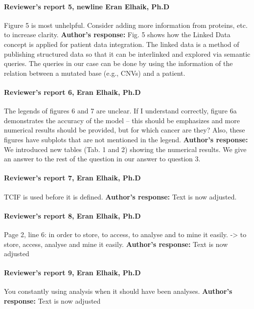 \documentclass{bmcart}
\begin{document}
\paragraph {Reviewer's report 5, newline Eran Elhaik, Ph.D}
 Figure 5 is most unhelpful. Consider adding more information from proteins, etc. to increase clarity.
\newline \textbf{Author's response:}
Fig. 5 shows how the Linked Data concept is applied for patient data integration. The linked data is a method of publishing structured data so that it can be interlinked and explored via semantic queries. The queries in our case can be done by using the information of the relation between a mutated base (e.g., CNVs) and a patient. 


\paragraph {Reviewer's report 6, Eran Elhaik, Ph.D}
The legends of figures 6 and 7 are unclear. If I understand correctly, figure 6a demonstrates the accuracy of the model – this should be emphasizes and more numerical results should be provided, but for which cancer are they? Also, these figures have subplots that are not mentioned in the legend.
\newline \textbf{Author's response:}
We introduced new tables (Tab. 1 and 2) showing the numerical results. We give an answer to the rest of the question in our answer to question 3.

\paragraph {Reviewer's report 7, Eran Elhaik, Ph.D}
TCIF is used before it is defined.
\newline \textbf{Author's response:}
Text is now adjusted.


\paragraph {Reviewer's report 8, Eran Elhaik, Ph.D}
Page 2, line 6: in order to store, to access, to analyse and to mine it easily. -> to store, access, analyse and mine it easily.
\newline \textbf{Author's response:}
Text is now adjusted


\paragraph {Reviewer's report 9, Eran Elhaik, Ph.D}
You constantly using analysis when it should have been analyses.
\newline \textbf{Author's response:}
Text is now adjusted
\end{document}
